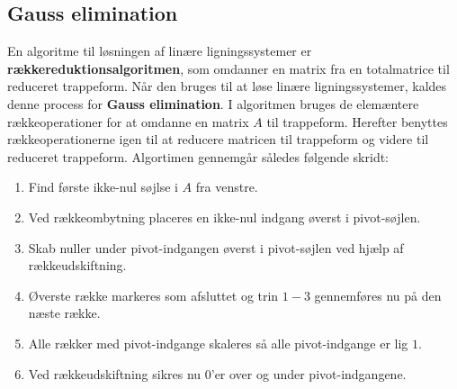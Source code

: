 \subsection{Gauss elimination}
En algoritme til løsningen af linære ligningssystemer er  \textbf{rækkereduktionsalgoritmen}, som omdanner en matrix fra en totalmatrice til reduceret trappeform.
Når den bruges til at løse linære ligningssystemer, kaldes denne process for \textbf{Gauss elimination}.
I algoritmen bruges de elemæntere rækkeoperationer for at omdanne en matrix $A$ til trappeform. 
Herefter benyttes rækkeoperationerne igen til at reducere matricen til trappeform og videre til reduceret trappeform.
Algortimen gennemgår således følgende skridt:
%
\begin{enumerate}
\item Find første ikke-nul søjlse i $A$ fra venstre.
\item Ved rækkeombytning placeres en ikke-nul indgang øverst i pivot-søjlen.
\item Skab nuller under pivot-indgangen øverst i pivot-søjlen ved hjælp af rækkeudskiftning.
\item Øverste række markeres som afsluttet og trin $1-3$ gennemføres nu på den næste række.
\item Alle rækker med pivot-indgange skaleres så alle pivot-indgange er lig $1$.
\item Ved rækkeudskiftning sikres nu $0$'er over og under pivot-indgangene.
\end{enumerate}
